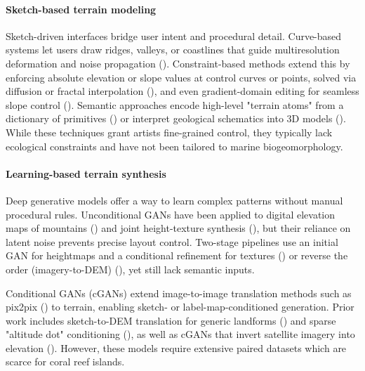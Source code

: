 \paragraph{Sketch-based terrain modeling}
Sketch-driven interfaces bridge user intent and procedural detail. Curve-based systems let users draw ridges, valleys, or coastlines that guide multiresolution deformation and noise propagation (\cite{Gain2009,Hnaidi2010}). Constraint-based methods extend this by enforcing absolute elevation or slope values at control curves or points, solved via diffusion or fractal interpolation (\cite{Gasch2020,Talgorn2018}), and even gradient-domain editing for seamless slope control (\cite{Guerin2022}). Semantic approaches encode high-level "terrain atoms" from a dictionary of primitives (\cite{Genevaux2015}) or interpret geological schematics into 3D models (\cite{Natali2012}). While these techniques grant artists fine-grained control, they typically lack ecological constraints and have not been tailored to marine biogeomorphology.

\paragraph{Learning-based terrain synthesis}
Deep generative models offer a way to learn complex patterns without manual procedural rules. Unconditional GANs have been applied to digital elevation maps of mountains (\cite{WulffJensen2018}) and joint height-texture synthesis (\cite{Spick2019}), but their reliance on latent noise prevents precise layout control. Two-stage pipelines use an initial GAN for heightmaps and a conditional refinement for textures (\cite{Beckham2017}) or reverse the order (imagery-to-DEM) (\cite{Panagiotou2020}), yet still lack semantic inputs.

Conditional GANs (cGANs) extend image-to-image translation methods such as pix2pix (\cite{Isola2017}) to terrain, enabling sketch- or label-map-conditioned generation. Prior work includes sketch-to-DEM translation for generic landforms (\cite{Guerin2017}) and sparse "altitude dot" conditioning (\cite{Voulgaris2021}), as well as cGANs that invert satellite imagery into elevation (\cite{Sisodia2022}). However, these models require extensive paired datasets which are scarce for coral reef islands.


